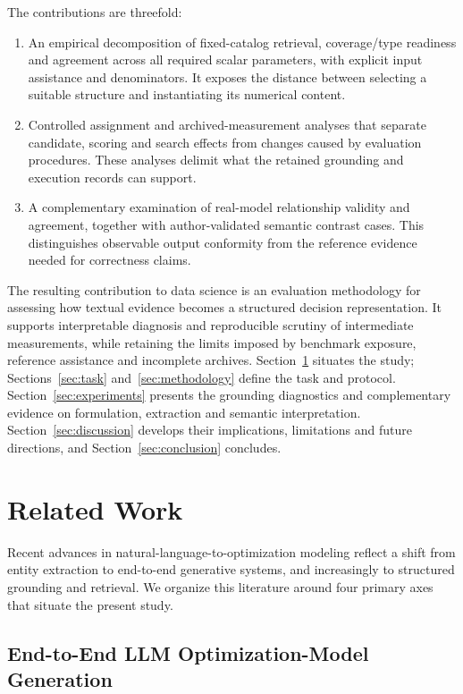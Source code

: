 \documentclass[pdflatex,sn-basic,Numbered]{sn-jnl}
\begin{document}
The contributions are threefold:
\label{subsec:intro_contributions}
\begin{enumerate}
\item An empirical decomposition of fixed-catalog retrieval, coverage/type readiness and agreement across all required scalar parameters, with explicit input assistance and denominators. It exposes the distance between selecting a suitable structure and instantiating its numerical content.
\item Controlled assignment and archived-measurement analyses that separate candidate, scoring and search effects from changes caused by evaluation procedures. These analyses delimit what the retained grounding and execution records can support.
\item A complementary examination of real-model relationship validity and agreement, together with author-validated semantic contrast cases. This distinguishes observable output conformity from the reference evidence needed for correctness claims.
\end{enumerate}

The resulting contribution to data science is an evaluation methodology for assessing how textual evidence becomes a structured decision representation. It supports interpretable diagnosis and reproducible scrutiny of intermediate measurements, while retaining the limits imposed by benchmark exposure, reference assistance and incomplete archives. Section~\ref{sec:related_work} situates the study; Sections~\ref{sec:task} and~\ref{sec:methodology} define the task and protocol. Section~\ref{sec:experiments} presents the grounding diagnostics and complementary evidence on formulation, extraction and semantic interpretation. Section~\ref{sec:discussion} develops their implications, limitations and future directions, and Section~\ref{sec:conclusion} concludes.

\section{Related Work}
\label{sec:related_work}

Recent advances in natural-language-to-optimization modeling reflect a shift from entity extraction to end-to-end generative systems, and increasingly to structured grounding and retrieval. We organize this literature around four primary axes that situate the present study.

\subsection{End-to-End LLM Optimization-Model Generation}
\label{subsec:rw_llm_generation}
\end{document}
